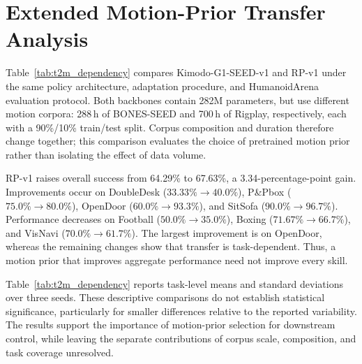 \section{Extended Motion-Prior Transfer Analysis}
\label{sec:t2m_analysis_appendix}

Table~\ref{tab:t2m_dependency} compares Kimodo-G1-SEED-v1 and RP-v1 under the same policy architecture, adaptation procedure, and HumanoidArena evaluation protocol. Both backbones contain 282M parameters, but use different motion corpora: 288\,h of BONES-SEED and 700\,h of Rigplay, respectively, each with a 90\%/10\% train/test split. Corpus composition and duration therefore change together; this comparison evaluates the choice of pretrained motion prior rather than isolating the effect of data volume.

RP-v1 raises overall success from 64.29\% to 67.63\%, a 3.34-percentage-point gain. Improvements occur on DoubleDesk ($33.33\%\to40.0\%$), P\&Pbox ($75.0\%\to80.0\%$), OpenDoor ($60.0\%\to93.3\%$), and SitSofa ($90.0\%\to96.7\%$). Performance decreases on Football ($50.0\%\to35.0\%$), Boxing ($71.67\%\to66.7\%$), and VisNavi ($70.0\%\to61.7\%$). The largest improvement is on OpenDoor, whereas the remaining changes show that transfer is task-dependent. Thus, a motion prior that improves aggregate performance need not improve every skill.

Table~\ref{tab:t2m_dependency} reports task-level means and standard deviations over three seeds. These descriptive comparisons do not establish statistical significance, particularly for smaller differences relative to the reported variability. The results support the importance of motion-prior selection for downstream control, while leaving the separate contributions of corpus scale, composition, and task coverage unresolved.
